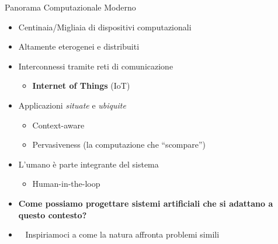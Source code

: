\documentclass[presentation, 10pt,aspectratio=169]{beamer}\mode<presentation>{\usetheme{AMSBolognaFC}}
\begin{document}
\begin{frame}{Panorama Computazionale Moderno}
	\begin{itemize}
		\item Centinaia/Migliaia di dispositivi computazionali
		\item Altamente eterogenei e distribuiti
		\item Interconnessi tramite reti di comunicazione
		\begin{itemize}
			\item \textbf{Internet of Things} (IoT)
		\end{itemize}
		\item Applicazioni \alert{\emph{situate}} e \alert{\emph{ubiquite}}
		\begin{itemize}
			\item Context-aware
			\item Pervasiveness (la computazione che ``scompare'')
		\end{itemize}
		\item L'umano è parte integrante del sistema
		\begin{itemize}
			\item Human-in-the-loop
		\end{itemize}
		\item \alert{\textbf{Come possiamo progettare sistemi artificiali che si adattano a questo contesto?}}
		\item \alert{\faLeaf} ~ Inspiriamoci a come la natura affronta problemi simili ~ \alert{\faLeaf}
	\end{itemize}
\end{frame}
\end{document}
